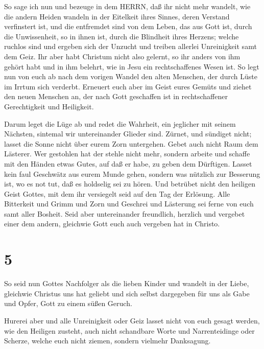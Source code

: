  So sage ich nun und bezeuge in dem HERRN, daß ihr nicht
mehr wandelt, wie die andern Heiden wandeln in der Eitelkeit ihres
Sinnes,  deren Verstand verfinstert ist, und die entfremdet
sind von dem Leben, das aus Gott ist, durch die Unwissenheit, so in
ihnen ist, durch die Blindheit ihres Herzens;  welche
ruchlos sind und ergeben sich der Unzucht und treiben allerlei
Unreinigkeit samt dem Geiz.  Ihr aber habt Christum nicht
also gelernt,  so ihr anders von ihm gehört habt und in ihm
belehrt, wie in Jesu ein rechtschaffenes Wesen ist.  So
legt nun von euch ab nach dem vorigen Wandel den alten Menschen, der
durch Lüste im Irrtum sich verderbt.  Erneuert euch aber im
Geist eures Gemüts  und ziehet den neuen Menschen an, der
nach Gott geschaffen ist in rechtschaffener Gerechtigkeit und
Heiligkeit.

 Darum leget die Lüge ab und redet die Wahrheit, ein
jeglicher mit seinem Nächsten, sintemal wir untereinander Glieder sind.
 Zürnet, und sündiget nicht; lasset die Sonne nicht über
eurem Zorn untergehen.  Gebet auch nicht Raum dem Lästerer.
 Wer gestohlen hat der stehle nicht mehr, sondern arbeite
und schaffe mit den Händen etwas Gutes, auf daß er habe, zu geben dem
Dürftigen.  Lasset kein faul Geschwätz aus eurem Munde
gehen, sondern was nützlich zur Besserung ist, wo es not tut, daß es
holdselig sei zu hören.  Und betrübet nicht den heiligen
Geist Gottes, mit dem ihr versiegelt seid auf den Tag der Erlösung.
 Alle Bitterkeit und Grimm und Zorn und Geschrei und
Lästerung sei ferne von euch samt aller Bosheit.  Seid aber
untereinander freundlich, herzlich und vergebet einer dem andern,
gleichwie Gott euch auch vergeben hat in Christo.

\hypertarget{section-4}{%
\section{5}\label{section-4}}

 So seid nun Gottes Nachfolger als die lieben Kinder
 und wandelt in der Liebe, gleichwie Christus uns hat
geliebt und sich selbst dargegeben für uns als Gabe und Opfer, Gott zu
einem süßen Geruch.

 Hurerei aber und alle Unreinigkeit oder Geiz lasset nicht
von euch gesagt werden, wie den Heiligen zusteht,  auch
nicht schandbare Worte und Narrenteidinge oder Scherze, welche euch
nicht ziemen, sondern vielmehr Danksagung.

